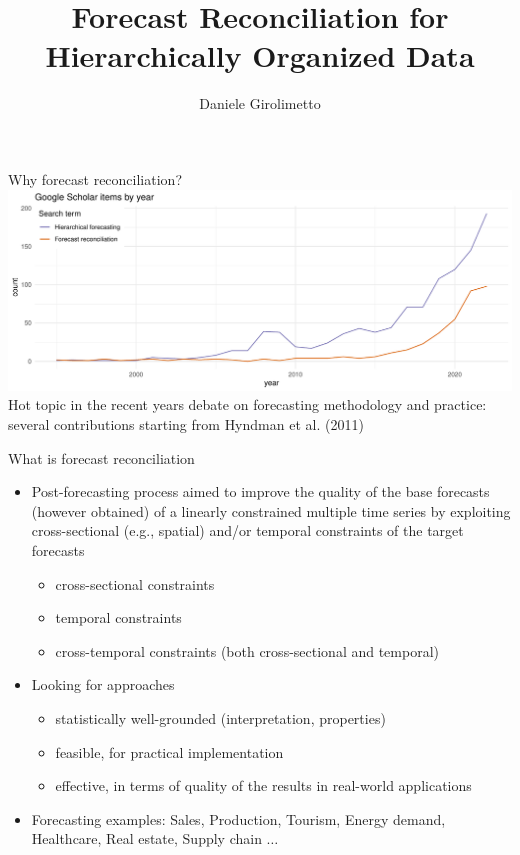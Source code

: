 \documentclass[aspectratio=169, table,colorlinks]{beamer}
\title{Forecast Reconciliation for \\ Hierarchically Organized Data}
\author{Daniele Girolimetto}
\begin{document}
\begin{frame}[plain, label = titlep]
   \maketitle
\end{frame}

\begin{frame}{Why forecast reconciliation?}
\centering
	\includegraphics[width = \linewidth]{img/gsplot.pdf}\\
	Hot topic in the recent years debate on forecasting methodology and practice: several contributions starting from {\color{newblue}Hyndman et al. (2011)}
\end{frame}


\begin{frame}{What is forecast reconciliation}
\begin{itemize}[itemsep = 0.5cm]
	\item Post-forecasting process aimed to improve the quality of the base forecasts (however obtained) of a {\color{newblue}linearly constrained} multiple time series by exploiting cross-sectional (e.g., spatial) and/or temporal constraints of the {\color{newblue}target} forecasts
	\begin{itemize}
		\item {\color{newblue}cross-sectional} constraints
		\item {\color{newblue}temporal} constraints
		\item {\color{newblue}cross-temporal} constraints (both cross-sectional and temporal)
	\end{itemize}
	 \item Looking for approaches
	\begin{itemize}
		\item {\color{newblue}statistically well-grounded} (interpretation, properties)
		\item {\color{newblue}feasible}, for practical implementation
		\item {\color{newblue}effective}, in terms of quality of the results in real-world applications
	\end{itemize}
	\item Forecasting examples: Sales, Production, Tourism, Energy demand, Healthcare, Real estate, Supply chain $\dots$
\end{itemize}	
\end{frame}
\end{document}
